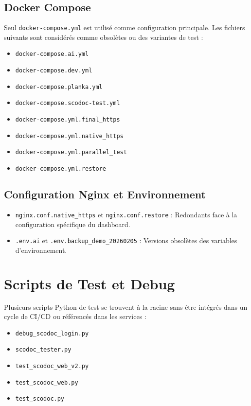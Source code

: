 \documentclass[a4paper,12pt]{article}
\begin{document}
\subsection{Docker Compose}
Seul \texttt{docker-compose.yml} est utilisé comme configuration principale. Les fichiers suivants sont considérés comme obsolètes ou des variantes de test :
\begin{itemize}
    \item \texttt{docker-compose.ai.yml}
    \item \texttt{docker-compose.dev.yml}
    \item \texttt{docker-compose.planka.yml}
    \item \texttt{docker-compose.scodoc-test.yml}
    \item \texttt{docker-compose.yml.final\_https}
    \item \texttt{docker-compose.yml.native\_https}
    \item \texttt{docker-compose.yml.parallel\_test}
    \item \texttt{docker-compose.yml.restore}
\end{itemize}

\subsection{Configuration Nginx et Environnement}
\begin{itemize}
    \item \texttt{nginx.conf.native\_https} et \texttt{nginx.conf.restore} : Redondants face à la configuration spécifique du dashboard.
    \item \texttt{.env.ai} et \texttt{.env.backup\_demo\_20260205} : Versions obsolètes des variables d'environnement.
\end{itemize}

\section{Scripts de Test et Debug}
Plusieurs scripts Python de test se trouvent à la racine sans être intégrés dans un cycle de CI/CD ou référencés dans les services :
\begin{itemize}
    \item \texttt{debug\_scodoc\_login.py}
    \item \texttt{scodoc\_tester.py}
    \item \texttt{test\_scodoc\_web\_v2.py}
    \item \texttt{test\_scodoc\_web.py}
    \item \texttt{test\_scodoc.py}
\end{itemize}
\end{document}
